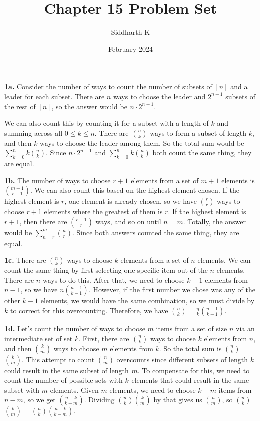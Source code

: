 \documentclass{article}
\title{Chapter 15 Problem Set}
\author{Siddharth K}
\date{February 2024}
\begin{document}
\maketitle

\textbf{1a.} Consider the number of ways to count the number of subsets of $[n]$ and a leader for each subset. There are $n$ ways to choose the leader and $2^{n - 1}$ subsets of the rest of $[n]$, so the answer would be $n \cdot 2^{n - 1}$.
\newline

We can also count this by counting it for a subset with a length of $k$ and summing across all $0 \le k \le n$. There are $n\choose k$ ways to form a subset of length $k$, and then $k$ ways to choose the leader among them. So the total sum would be $\sum_{k = 0}^n k$$n\choose k$. Since $n \cdot 2^{n - 1}$ and $\sum_{k = 0}^n k$$n\choose k$ both count the same thing, they are equal.
\newline

\textbf{1b.} The number of ways to choose $r + 1$ elements from a set of $m + 1$ elements is ${m + 1}\choose {r + 1}$. We can also count this based on the highest element chosen. If the highest element is $r$, one element is already chosen, so we have $r\choose r$ ways to choose $r + 1$ elements where the greatest of them is $r$. If the highest element is $r + 1$, then there are ${r + 1}\choose r$ ways, and so on until $n = m$. Totally, the answer would be $\sum_{n = r}^m$$n\choose r$. Since both answers counted the same thing, they are equal.
\newline

\textbf{1c.} There are $n\choose k$ ways to choose $k$ elements from a set of $n$ elements. We can count the same thing by first selecting one specific item out of the $n$ elements. There are $n$ ways to do this. After that, we need to choose $k - 1$ elements from $n - 1$, so we have $n$${n - 1}\choose {k - 1}$. However, if the first number we chose was any of the other $k - 1$ elements, we would have the same combination, so we must divide by $k$ to correct for this overcounting. Therefore, we have $n\choose k$$= \frac{n}{k}$${n - 1}\choose {k - 1}$.
\newline

\textbf{1d.} Let's count the number of ways to choose $m$ items from a set of size $n$ via an intermediate set of set $k$. First, there are $n\choose k$ ways to choose $k$ elements from $n$, and then $k\choose m$ ways to choose $m$ elements from $k$. So the total sum is $n\choose k$$k\choose m$. This attempt to count $n\choose m$ overcounts since different subsets of length $k$ could result in the same subset of length $m$. To compensate for this, we need to count the number of possible sets with $k$ elements that could result in the same subset with $m$ elements. Given $m$ elements, we need to choose $k - m$ items from $n - m$, so we get ${n - k}\choose {k - m}$. Dividing $n\choose k$$k\choose m$ by that gives us $n\choose m$, so $n\choose k$$k\choose m$$=$$n\choose k$${n - k}\choose {k - m}$.
\newline
\end{document}
